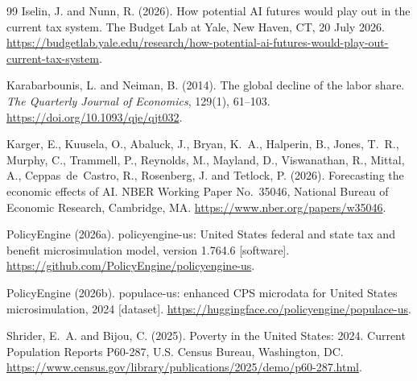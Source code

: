 \begin{thebibliography}{99}
Iselin, J. and Nunn, R. (2026).
\newblock How potential AI futures would play out in the current tax system.
\newblock The Budget Lab at Yale, New Haven, CT, 20 July 2026.
\newblock \url{https://budgetlab.yale.edu/research/how-potential-ai-futures-would-play-out-current-tax-system}.

Karabarbounis, L. and Neiman, B. (2014).
\newblock The global decline of the labor share.
\newblock \emph{The Quarterly Journal of Economics}, 129(1), 61--103.
\newblock \url{https://doi.org/10.1093/qje/qjt032}.

Karger, E., Kuusela, O., Abaluck, J., Bryan, K.~A., Halperin, B., Jones,
T.~R., Murphy, C., Trammell, P., Reynolds, M., Mayland, D., Viswanathan,
R., Mittal, A., Ceppas~de~Castro, R., Rosenberg, J. and Tetlock, P. (2026).
\newblock Forecasting the economic effects of AI.
\newblock NBER Working Paper No.~35046, National Bureau of Economic
Research, Cambridge, MA.
\newblock \url{https://www.nber.org/papers/w35046}.

PolicyEngine (2026a).
\newblock policyengine-us: United States federal and state tax and benefit
microsimulation model, version 1.764.6 [software].
\newblock \url{https://github.com/PolicyEngine/policyengine-us}.

PolicyEngine (2026b).
\newblock populace-us: enhanced CPS microdata for United States
microsimulation, 2024 [dataset].
\newblock \url{https://huggingface.co/policyengine/populace-us}.

Shrider, E.~A. and Bijou, C. (2025).
\newblock Poverty in the United States: 2024.
\newblock Current Population Reports P60-287, U.S. Census Bureau,
Washington, DC.
\newblock \url{https://www.census.gov/library/publications/2025/demo/p60-287.html}.

\end{thebibliography}
